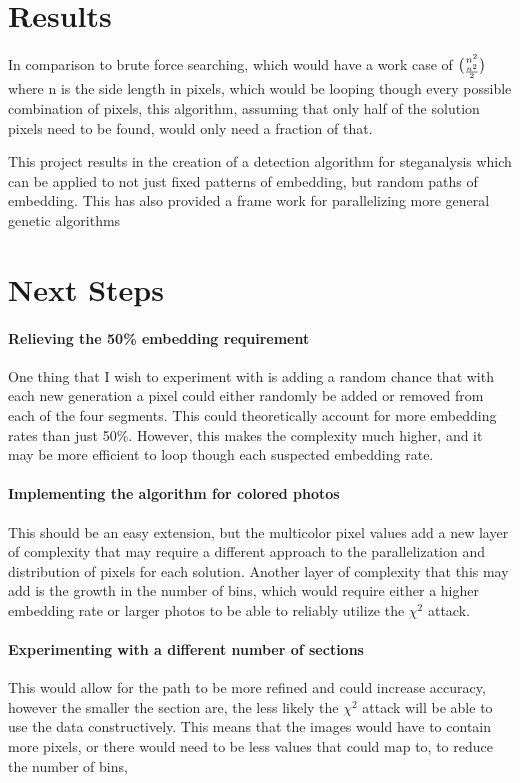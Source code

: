 \documentclass[12pt]{article}
\begin{document}
\section{Results}
\quad In comparison to brute force searching, which would have a work case of $ {  { n^2 } \choose  { { n^2 } \over 2 } } $ where n is the side length in pixels, which would be looping though every possible combination of pixels, this algorithm, assuming that only half of the solution pixels need to be found, would only need a fraction of that. 
\par This project results in the creation of a detection algorithm for steganalysis which can be applied to not just fixed patterns of embedding, but random paths of embedding. This has also provided a frame work for parallelizing more general genetic algorithms

\section{Next Steps}
\paragraph{Relieving the 50\% embedding requirement}
\par One thing that I wish to experiment with is adding a random chance that with each new generation a pixel could either randomly be added or removed from each of the four segments. This could theoretically account for more embedding rates than just 50\%. However, this makes the complexity much higher, and it may be more efficient to loop though each suspected embedding rate.
\paragraph{Implementing the algorithm for colored photos}
\par This should be an easy extension, but the multicolor pixel values add a new layer of complexity that may require a different approach to the parallelization and distribution of pixels for each solution. Another layer of complexity that this may add is the growth in the number of bins, which would require either a higher embedding rate or larger photos to be able to reliably utilize the $\chi ^2$ attack.
\paragraph{Experimenting with a different number of sections}
\par This would allow for the path to be more refined and could increase accuracy, however the smaller the section are, the less likely the $\chi ^2$ attack will be able to use the data constructively. This means that the images would have to contain more pixels, or there would need to be less values that could map to, to reduce the number of bins,
\end{document}
